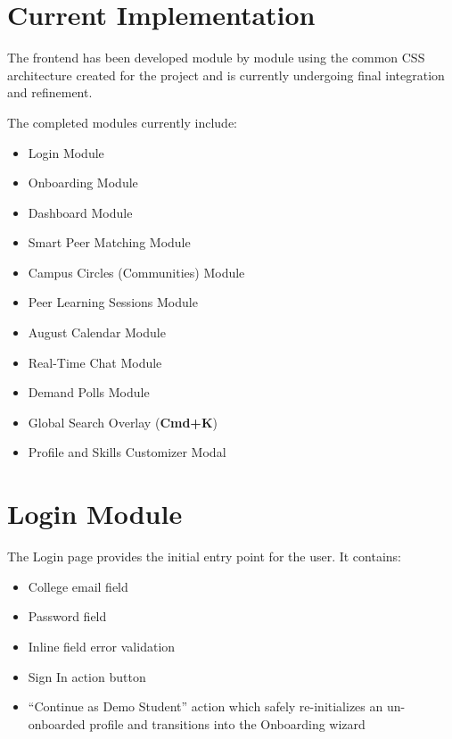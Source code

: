 \documentclass[12pt,a4paper]{report}
\begin{document}
\section{Current Implementation}
The frontend has been developed module by module using the common CSS architecture created for the project and is currently undergoing final integration and refinement.

The completed modules currently include:
\begin{itemize}
    \item Login Module
    \item Onboarding Module
    \item Dashboard Module
    \item Smart Peer Matching Module
    \item Campus Circles (Communities) Module
    \item Peer Learning Sessions Module
    \item August Calendar Module
    \item Real-Time Chat Module
    \item Demand Polls Module
    \item Global Search Overlay (\textbf{Cmd+K})
    \item Profile and Skills Customizer Modal
\end{itemize}

\section{Login Module}
The Login page provides the initial entry point for the user.
It contains:
\begin{itemize}
    \item College email field
    \item Password field
    \item Inline field error validation
    \item Sign In action button
    \item ``Continue as Demo Student'' action which safely re-initializes an un-onboarded profile and transitions into the Onboarding wizard
\end{itemize}
\end{document}
